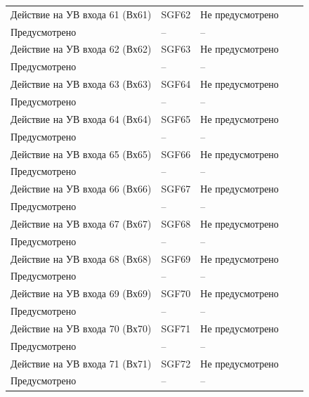 \begin{longtable}{|>{\centering\arraybackslash}m{5.3cm}|>{\centering\arraybackslash}m{3.3cm}|>{\centering\arraybackslash}m{4.2cm}|>{\centering\arraybackslash}m{1.8cm}|>{\centering\arraybackslash}m{1cm}|}
\hline
\centering Действие на УВ входа 61 (Вх61)  & \centering SGF62 & \centering Не предусмотрено \\ Предусмотрено & \centering -- & \centering \arraybackslash -- \\
\hline
\centering Действие на УВ входа 62 (Вх62)  & \centering SGF63 & \centering Не предусмотрено \\ Предусмотрено & \centering -- & \centering \arraybackslash -- \\
\hline
\centering Действие на УВ входа 63 (Вх63)  & \centering SGF64 & \centering Не предусмотрено \\ Предусмотрено & \centering -- & \centering \arraybackslash -- \\
\hline
\centering Действие на УВ входа 64 (Вх64)  & \centering SGF65 & \centering Не предусмотрено \\ Предусмотрено & \centering -- & \centering \arraybackslash -- \\
\hline
\centering Действие на УВ входа 65 (Вх65)  & \centering SGF66 & \centering Не предусмотрено \\ Предусмотрено & \centering -- & \centering \arraybackslash -- \\
\hline
\centering Действие на УВ входа 66 (Вх66)  & \centering SGF67 & \centering Не предусмотрено \\ Предусмотрено & \centering -- & \centering \arraybackslash -- \\
\hline
\centering Действие на УВ входа 67 (Вх67)  & \centering SGF68 & \centering Не предусмотрено \\ Предусмотрено & \centering -- & \centering \arraybackslash -- \\
\hline
\centering Действие на УВ входа 68 (Вх68)  & \centering SGF69 & \centering Не предусмотрено \\ Предусмотрено & \centering -- & \centering \arraybackslash -- \\
\hline
\centering Действие на УВ входа 69 (Вх69)  & \centering SGF70 & \centering Не предусмотрено \\ Предусмотрено & \centering -- & \centering \arraybackslash -- \\
\hline
\centering Действие на УВ входа 70 (Вх70)  & \centering SGF71 & \centering Не предусмотрено \\ Предусмотрено & \centering -- & \centering \arraybackslash -- \\
\hline
\centering Действие на УВ входа 71 (Вх71)  & \centering SGF72 & \centering Не предусмотрено \\ Предусмотрено & \centering -- & \centering \arraybackslash -- \\

\end{longtable}
